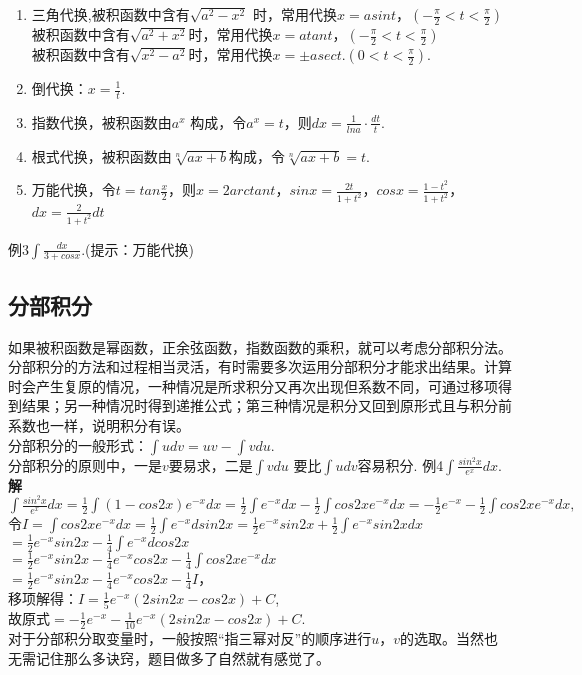 \documentclass[UTF8]{ctexart}
\begin{document}
\begin{enumerate}[(1)]
\item 三角代换,被积函数中含有$\sqrt{a^2-x^2}$ 时，常用代换$x=asint$，$(\displaystyle{-\frac{\pi}{2}<t<\frac{\pi}{2}})$
\\ 被积函数中含有$\sqrt{a^2+x^2}$时，常用代换$x=atant$，$(\displaystyle{-\frac{\pi}{2}<t<\frac{\pi}{2}})$
\\ 被积函数中含有$\sqrt{x^2-a^2}$时，常用代换$x=\pm asect$.$(\displaystyle{0<t<\frac{\pi}{2}}).$
\item 倒代换：$x=\frac{1}{t}$.
\item 指数代换，被积函数由$a^x$ 构成，令$a^x=t$，则$\displaystyle{dx=\frac{1}{lna}\cdot \frac{dt}{t}}.$
\item 根式代换，被积函数由$\sqrt[n]{ax+b}$构成，令$\sqrt[n]{ax+b}=t.$
\item 万能代换，令$\displaystyle{t=tan\frac{x}{2}}$，则$x=2arctant$，$\displaystyle{sinx=\frac{2t}{1+t^2}}$，$\displaystyle{cosx=\frac{1-t^2}{1+t^2}}$，$\displaystyle{dx=\frac{2}{1+t^2}dt}$
\end{enumerate}
例3\quad $\displaystyle{\int \frac{dx}{3+cosx}}.$(提示：万能代换)
\vspace{-4mm} \subsection{分部积分}  \vspace{-2mm} \small 如果被积函数是幂函数，正余弦函数，指数函数的乘积，就可以考虑分部积分法。分部积分的方法和过程相当灵活，有时需要多次运用分部积分才能求出结果。计算时会产生复原的情况，一种情况是所求积分又再次出现但系数不同，可通过移项得到结果；另一种情况时得到递推公式；第三种情况是积分又回到原形式且与积分前系数也一样，说明积分有误。
\\分部积分的一般形式：$\displaystyle{\int udv=uv-\int vdu}.$
\\分部积分的原则中，一是$v$要易求，二是$\displaystyle{\int vdu}$ 要比$\displaystyle{\int udv}$容易积分.
例4$\displaystyle{\int \frac{sin^2x}{e^x}dx}$.
\\ \textbf{解} $\displaystyle{\int \frac{sin^2x}{e^x}dx=\frac{1}{2}\int (1-cos2x)e^{-x}dx=\frac{1}{2}\int e^{-x}dx-\frac{1}{2}\int cos2xe^{-x}dx=-\frac{1}{2}e^{-x}-\frac{1}{2}\int cos2xe^{-x}dx,}$
 \\ 令$\displaystyle{I=\int cos2xe^{-x}dx=\frac{1}{2}\int e^{-x}dsin2x=\frac{1}{2}e^{-x}sin2x+\frac{1}{2}\int e^{-x}sin2xdx}$
\\ $\displaystyle{=\frac{1}{2}e^{-x}sin2x-\frac{1}{4}\int e^{-x}dcos2x}$
\\ $\displaystyle{=\frac{1}{2}e^{-x}sin2x-\frac{1}{4}e^{-x}cos2x-\frac{1}{4}\int cos2xe^{-x}dx}$
\\ $\displaystyle{=\frac{1}{2}e^{-x}sin2x-\frac{1}{4}e^{-x}cos2x-\frac{1}{4}I}$，
\\ 移项解得：$\displaystyle{I=\frac{1}{5}e^{-x}(2sin2x-cos2x)+C}$,
\\ 故原式$\displaystyle{=-\frac{1}{2}e^{-x}-\frac{1}{10}e^{-x}(2sin2x-cos2x)+C.}$
\\ 对于分部积分取变量时，一般按照“指三幂对反”的顺序进行$u$，$v$的选取。当然也无需记住那么多诀窍，题目做多了自然就有感觉了。
\end{document}
